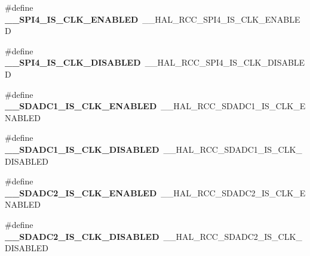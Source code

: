 \begin{DoxyCompactItemize}
\item 
\#define {\bfseries \+\_\+\+\_\+\+S\+P\+I4\+\_\+\+I\+S\+\_\+\+C\+L\+K\+\_\+\+E\+N\+A\+B\+L\+ED}~\+\_\+\+\_\+\+H\+A\+L\+\_\+\+R\+C\+C\+\_\+\+S\+P\+I4\+\_\+\+I\+S\+\_\+\+C\+L\+K\+\_\+\+E\+N\+A\+B\+L\+ED\hypertarget{group___h_a_l___r_c_c___aliased_ga30d37b49b9b44a979d02cd7ebfad048b}{}\label{group___h_a_l___r_c_c___aliased_ga30d37b49b9b44a979d02cd7ebfad048b}

\item 
\#define {\bfseries \+\_\+\+\_\+\+S\+P\+I4\+\_\+\+I\+S\+\_\+\+C\+L\+K\+\_\+\+D\+I\+S\+A\+B\+L\+ED}~\+\_\+\+\_\+\+H\+A\+L\+\_\+\+R\+C\+C\+\_\+\+S\+P\+I4\+\_\+\+I\+S\+\_\+\+C\+L\+K\+\_\+\+D\+I\+S\+A\+B\+L\+ED\hypertarget{group___h_a_l___r_c_c___aliased_gaaf50175966a77411fd792be594bb0c55}{}\label{group___h_a_l___r_c_c___aliased_gaaf50175966a77411fd792be594bb0c55}

\item 
\#define {\bfseries \+\_\+\+\_\+\+S\+D\+A\+D\+C1\+\_\+\+I\+S\+\_\+\+C\+L\+K\+\_\+\+E\+N\+A\+B\+L\+ED}~\+\_\+\+\_\+\+H\+A\+L\+\_\+\+R\+C\+C\+\_\+\+S\+D\+A\+D\+C1\+\_\+\+I\+S\+\_\+\+C\+L\+K\+\_\+\+E\+N\+A\+B\+L\+ED\hypertarget{group___h_a_l___r_c_c___aliased_gaa7042e6be9f2529f230c8cd07d23be8b}{}\label{group___h_a_l___r_c_c___aliased_gaa7042e6be9f2529f230c8cd07d23be8b}

\item 
\#define {\bfseries \+\_\+\+\_\+\+S\+D\+A\+D\+C1\+\_\+\+I\+S\+\_\+\+C\+L\+K\+\_\+\+D\+I\+S\+A\+B\+L\+ED}~\+\_\+\+\_\+\+H\+A\+L\+\_\+\+R\+C\+C\+\_\+\+S\+D\+A\+D\+C1\+\_\+\+I\+S\+\_\+\+C\+L\+K\+\_\+\+D\+I\+S\+A\+B\+L\+ED\hypertarget{group___h_a_l___r_c_c___aliased_ga2dfed9a0fbfa7be8f90c4e3ce72c25fe}{}\label{group___h_a_l___r_c_c___aliased_ga2dfed9a0fbfa7be8f90c4e3ce72c25fe}

\item 
\#define {\bfseries \+\_\+\+\_\+\+S\+D\+A\+D\+C2\+\_\+\+I\+S\+\_\+\+C\+L\+K\+\_\+\+E\+N\+A\+B\+L\+ED}~\+\_\+\+\_\+\+H\+A\+L\+\_\+\+R\+C\+C\+\_\+\+S\+D\+A\+D\+C2\+\_\+\+I\+S\+\_\+\+C\+L\+K\+\_\+\+E\+N\+A\+B\+L\+ED\hypertarget{group___h_a_l___r_c_c___aliased_gaeb4574351930d88897bc5929cdc6dc0a}{}\label{group___h_a_l___r_c_c___aliased_gaeb4574351930d88897bc5929cdc6dc0a}

\item 
\#define {\bfseries \+\_\+\+\_\+\+S\+D\+A\+D\+C2\+\_\+\+I\+S\+\_\+\+C\+L\+K\+\_\+\+D\+I\+S\+A\+B\+L\+ED}~\+\_\+\+\_\+\+H\+A\+L\+\_\+\+R\+C\+C\+\_\+\+S\+D\+A\+D\+C2\+\_\+\+I\+S\+\_\+\+C\+L\+K\+\_\+\+D\+I\+S\+A\+B\+L\+ED\hypertarget{group___h_a_l___r_c_c___aliased_ga81f339353e933bdc48a36ef318981a45}{}\label{group___h_a_l___r_c_c___aliased_ga81f339353e933bdc48a36ef318981a45}


\end{DoxyCompactItemize}
